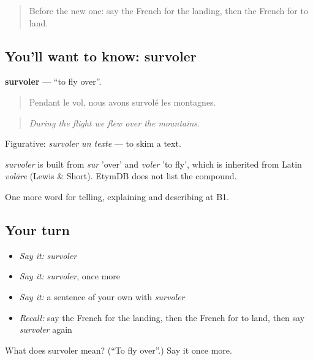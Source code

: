 \label{lesson:FR-C419-survoler}



\begin{quote}
Before the new one: say the French for the landing, then the French for to land.
\end{quote}

\subsection*{You'll want to know: survoler}
\textbf{survoler} — \textquotedblleft{}to fly over\textquotedblright{}.

\begin{quote}
Pendant le vol, nous avons survolé les montagnes.
\end{quote}

\begin{quote}
\emph{During the flight we flew over the mountains.}
\end{quote}

Figurative: \emph{survoler un texte} — to skim a text.

\begin{cousinweb}
\emph{survoler} is built from \emph{sur} 'over' and \emph{voler} 'to fly', which is inherited from Latin \emph{volāre} (Lewis \& Short). EtymDB does not list the compound.
\end{cousinweb}

\begin{grammarlens}[title={What you've built}]
One more word for telling, explaining and describing at B1.
\end{grammarlens}

\subsection*{Your turn}
\begin{itemize}
\raggedright
  \item \emph{Say it:} \emph{survoler}
  \item \emph{Say it:} \emph{survoler}, once more
  \item \emph{Say it:} a sentence of your own with \emph{survoler}
  \item \emph{Recall:} say the French for the landing, then the French for to land, then say \emph{survoler} again
\end{itemize}

\begin{tcolorbox}[breakable,colback=teal!4,colframe=teal!35!black,title={Before you move on}]
What does survoler mean? (\textquotedblleft{}To fly over\textquotedblright{}.) Say it once more.
\end{tcolorbox}
